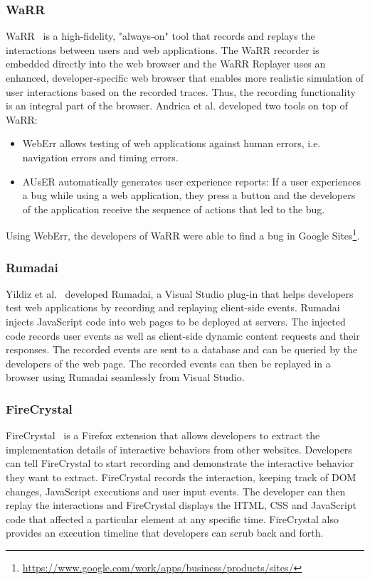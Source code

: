 \subsubsection{WaRR}

WaRR~\cite{warr2011} is a high-fidelity, "always-on" tool that records and replays the interactions between users and web applications. The WaRR recorder is embedded directly into the web browser and the WaRR Replayer uses an enhanced, developer-specific web browser that enables more realistic simulation of user interactions based on the recorded traces. Thus, the recording functionality is an integral part of the browser. Andrica et al. developed two tools on top of WaRR:
\begin{itemize}
	\item WebErr allows testing of web applications against human errors, i.e. navigation errors and timing errors.
	\item AUsER automatically generates user experience reports: If a user experiences a bug while using a web application, they press a button and the developers of the application receive the sequence of actions that led to the bug.
\end{itemize}
Using WebErr, the developers of WaRR were able to find a bug in Google Sites\footnote{\url{https://www.google.com/work/apps/business/products/sites/}}.

\subsubsection{Rumadai}

Yildiz et al.~\cite{rumadai2012} developed Rumadai, a Visual Studio plug-in that helps developers test web applications by recording and replaying client-side events. Rumadai injects JavaScript code into web pages to be deployed at servers. The injected code records user events as well as client-side dynamic content requests and their responses. The recorded events are sent to a database and can be queried by the developers of the web page. The recorded events can then be replayed in a browser using Rumadai seamlessly from Visual Studio.

\subsubsection{FireCrystal}

FireCrystal~\cite{firecrystal2009} is a Firefox extension that allows developers to extract the implementation details of interactive behaviors from other websites. Developers can tell FireCrystal to start recording and demonstrate the interactive behavior they want to extract. FireCrystal records the interaction, keeping track of DOM changes, JavaScript executions and user input events. The developer can then replay the interactions and FireCrystal displays the HTML, CSS and JavaScript code that affected a particular element at any specific time. FireCrystal also provides an execution timeline that developers can scrub back and forth.

